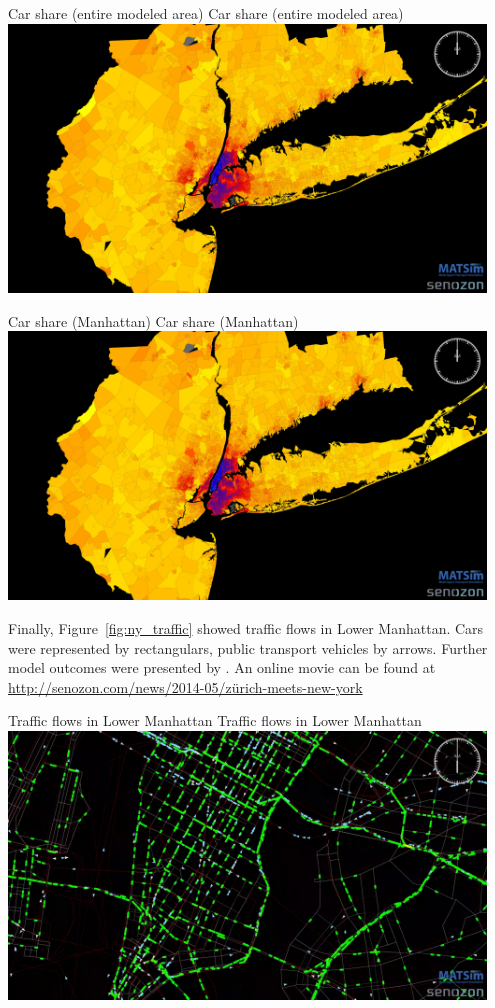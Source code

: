 \createfigure%
{Car share (entire modeled area)}%
{Car share (entire modeled area)}%
{\label{fig:ny_car_share_full}}%
{\includegraphics[width=0.95\textwidth, angle=0]{./scenarios/figures/ny_carshare_TAZ_full.png}}%
{}

\createfigure%
{Car share (Manhattan)}%
{Car share (Manhattan)}%
{\label{fig:ny_car_share_gross}}%
{\includegraphics[width=0.95\textwidth, angle=0]{./scenarios/figures/ny_carshare_TAZ_full.png}}%
{}

Finally, Figure~\ref{fig:ny_traffic} showed traffic flows in Lower Manhattan. Cars were represented by rectangulars, public transport vehicles by arrows. Further model outcomes were presented by \citet[][]{Balmer_unpub_ZMNY_2014}. An online movie can be found at \url{http://senozon.com/news/2014-05/zürich-meets-new-york}

\createfigure%
{Traffic flows in Lower Manhattan}%
{Traffic flows in Lower Manhattan}%
{\label{fig:ny_traffic}}%
{\includegraphics[width=0.95\textwidth, angle=0]{./scenarios/figures/ny_traffic.png}}%
{}

